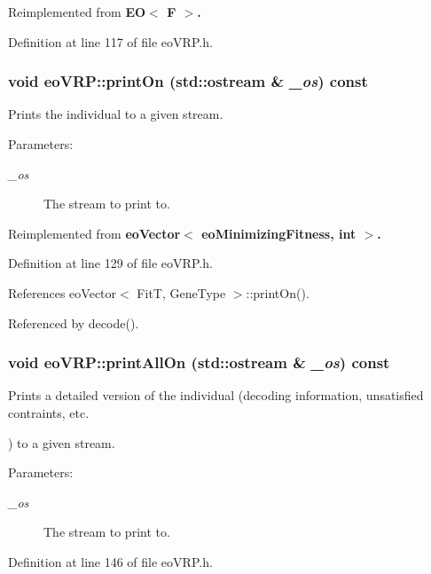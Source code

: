 Reimplemented from \bf{EO$<$ F $>$}.

Definition at line 117 of file eo\-VRP.h.
\subsubsection{\setlength{\rightskip}{0pt plus 5cm}void eo\-VRP::print\-On (std::ostream \& {\em \_\-os}) const\hspace{0.3cm}{\tt  [inline, virtual]}}\label{classeo_v_r_p_dc4cb13768ef1a2c810d4d298b36707c}


Prints the individual to a given stream. 

\begin{Desc}
\item[Parameters:]
\begin{description}
\item[{\em \_\-os}]The stream to print to. \end{description}
\end{Desc}


Reimplemented from \bf{eo\-Vector$<$ eo\-Minimizing\-Fitness, int $>$}.

Definition at line 129 of file eo\-VRP.h.

References eo\-Vector$<$ Fit\-T, Gene\-Type $>$::print\-On().

Referenced by decode().
\subsubsection{\setlength{\rightskip}{0pt plus 5cm}void eo\-VRP::print\-All\-On (std::ostream \& {\em \_\-os}) const\hspace{0.3cm}{\tt  [inline]}}\label{classeo_v_r_p_738f0aa43d8608cc68e41b1d3f8c944d}


Prints a detailed version of the individual (decoding information, unsatisfied contraints, etc. 

) to a given stream. \begin{Desc}
\item[Parameters:]
\begin{description}
\item[{\em \_\-os}]The stream to print to. \end{description}
\end{Desc}


Definition at line 146 of file eo\-VRP.h.

